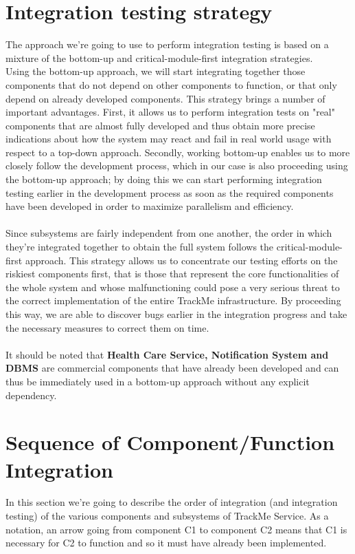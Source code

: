 \documentclass[a4paper, hidelinks, 12pt]{report}
\begin{document}
	\section{Integration testing strategy}
	The approach we're going to use to perform integration testing is based on a mixture of the bottom-up and critical-module-first integration strategies.\\
	
	Using the bottom-up approach, we will start integrating together those components that do not depend on other components to function, or that only depend on already developed components. This strategy brings a number of important advantages. First, it allows us to perform integration tests on "real" components that are almost fully developed and thus obtain more precise indications about how the system may react and fail in real world usage with respect to a top-down approach. Secondly, working bottom-up enables us to more closely follow the development process, which in our case is also proceeding using the bottom-up approach; by doing this we can start performing integration testing earlier in the development process as soon as the required components have been developed in order to maximize parallelism and efficiency.\\\\
	
	Since subsystems are fairly independent from one another, the order in which they're integrated together to obtain the full system follows the critical-module-first approach. This strategy allows us to concentrate our testing efforts on the riskiest components first, that is those that represent the core functionalities of the whole system and whose malfunctioning could pose a very serious threat to the correct implementation of the entire TrackMe infrastructure. By proceeding this way, we are able to discover bugs earlier in the integration progress and take the necessary measures to correct them on time.\\\\
	
	It should be noted that \textbf{Health Care Service, Notification System and DBMS} are commercial components that
have already been developed and can thus be immediately used in a bottom-up approach without any explicit dependency.
			
	\section{Sequence of Component/Function Integration}
	In this section we're going to describe the order of integration (and integration testing) of the various components and subsystems of TrackMe Service. As a notation, an arrow going from component C1 to component C2 means that C1 is necessary for C2 to function and so it must have already been implemented.
				
\end{document}
